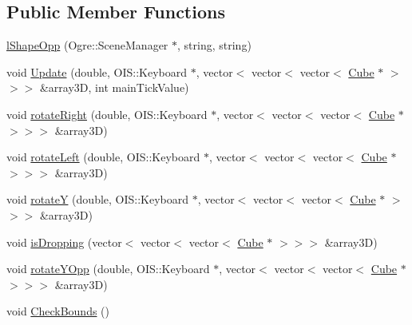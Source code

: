 \subsection*{Public Member Functions}
\begin{DoxyCompactItemize}
\item 
\hyperlink{classl_shape_opp_a7a0b2895e0a938ce7cc7c20226aec7a3}{l\-Shape\-Opp} (Ogre\-::\-Scene\-Manager $\ast$, string, string)
\item 
void \hyperlink{classl_shape_opp_af4306c51154f8ceaabec8c98fca73cd8}{Update} (double, O\-I\-S\-::\-Keyboard $\ast$, vector$<$ vector$<$ vector$<$ \hyperlink{class_cube}{Cube} $\ast$ $>$$>$$>$ \&array3\-D, int main\-Tick\-Value)
\item 
void \hyperlink{classl_shape_opp_a2a6bed136faac6df5e4962a7b909d126}{rotate\-Right} (double, O\-I\-S\-::\-Keyboard $\ast$, vector$<$ vector$<$ vector$<$ \hyperlink{class_cube}{Cube} $\ast$ $>$$>$$>$ \&array3\-D)
\item 
void \hyperlink{classl_shape_opp_afe1f6f03d46c0043b170961d4bc1f1b4}{rotate\-Left} (double, O\-I\-S\-::\-Keyboard $\ast$, vector$<$ vector$<$ vector$<$ \hyperlink{class_cube}{Cube} $\ast$ $>$$>$$>$ \&array3\-D)
\item 
void \hyperlink{classl_shape_opp_a1f41e4ace4ae07adbad0524a3cd80013}{rotate\-Y} (double, O\-I\-S\-::\-Keyboard $\ast$, vector$<$ vector$<$ vector$<$ \hyperlink{class_cube}{Cube} $\ast$ $>$$>$$>$ \&array3\-D)
\item 
void \hyperlink{classl_shape_opp_a6da0e90ceec19c7906694b782f1e316d}{is\-Dropping} (vector$<$ vector$<$ vector$<$ \hyperlink{class_cube}{Cube} $\ast$ $>$$>$$>$ \&array3\-D)
\item 
void \hyperlink{classl_shape_opp_a0942fefd0a4706a9805f831805d00270}{rotate\-Y\-Opp} (double, O\-I\-S\-::\-Keyboard $\ast$, vector$<$ vector$<$ vector$<$ \hyperlink{class_cube}{Cube} $\ast$ $>$$>$$>$ \&array3\-D)
\item 
void \hyperlink{classl_shape_opp_a270e1c268e5dd52cc7eb529a39cccf13}{Check\-Bounds} ()
\end{DoxyCompactItemize}
